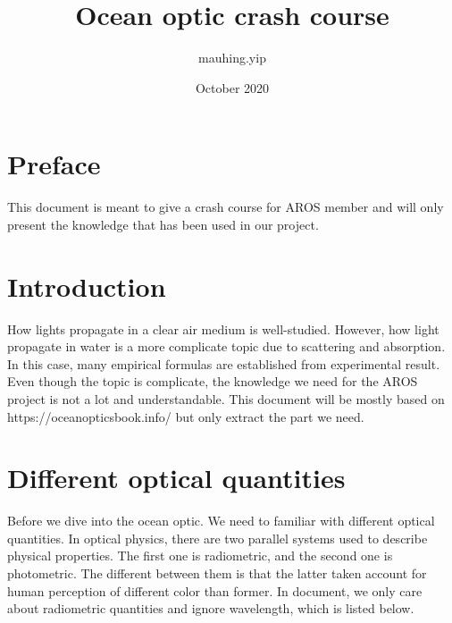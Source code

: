 \documentclass{article}
\title{Ocean optic crash course}
\author{mauhing.yip }
\date{October 2020}
\begin{document}
\maketitle

\section{Preface}
This document is meant to give a crash course for AROS member and will only present the knowledge that has been used in our project.

\section{Introduction}
How lights propagate in a clear air medium is well-studied. However, how light propagate in water is a more complicate topic due to scattering and absorption. In this case, many empirical formulas are established from experimental result. Even though the topic is complicate, the knowledge we need for the AROS project is not a lot and understandable. This document will be mostly based on https://oceanopticsbook.info/ but only extract the part we need.

\section{Different optical quantities}
Before we dive into the ocean optic. We need to familiar with different optical quantities. In optical physics, there are two parallel systems used to describe physical properties. The first one is radiometric, and the second one is photometric. The different between them is that the latter taken account for human perception of different color than former. In document, we only care about radiometric quantities and ignore wavelength, which is listed below.
\end{document}
